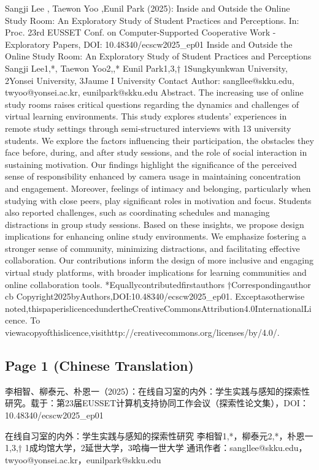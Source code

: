 \documentclass[12pt]{ctexart}
\begin{document}
Sangji Lee , Taewon Yoo ,Eunil Park (2025): Inside and Outside the Online Study
Room: An Exploratory Study of Student Practices and Perceptions. In: Proc. 23rd
EUSSET Conf. on Computer-Supported Cooperative Work - Exploratory Papers, DOI:
10.48340/ecscw2025\_ep01
Inside and Outside the Online Study
Room: An Exploratory Study of Student
Practices and Perceptions
Sangji Lee1,*, Taewon Yoo2,,* Eunil Park1,3,†
1Sungkyunkwan University, 2Yonsei University, 3Jaume I University
Contact Author: sangllee@skku.edu, twyoo@yonsei.ac.kr, eunilpark@skku.edu
Abstract. The increasing use of online study rooms raises critical questions regarding the
dynamics and challenges of virtual learning environments. This study explores students’
experiences in remote study settings through semi-structured interviews with 13 university
students. We explore the factors influencing their participation, the obstacles they face
before, during, and after study sessions, and the role of social interaction in sustaining
motivation. Our findings highlight the significance of the perceived sense of responsibility
enhanced by camera usage in maintaining concentration and engagement. Moreover,
feelings of intimacy and belonging, particularly when studying with close peers, play
significant roles in motivation and focus. Students also reported challenges, such as
coordinating schedules and managing distractions in group study sessions. Based on
these insights, we propose design implications for enhancing online study environments.
We emphasize fostering a stronger sense of community, minimizing distractions, and
facilitating effective collaboration. Our contributions inform the design of more inclusive
and engaging virtual study platforms, with broader implications for learning communities
and online collaboration tools.
*Equallycontributedfirstauthors
†Correspondingauthor
cb
Copyright2025byAuthors,DOI:10.48340/ecscw2025\_ep01. Exceptasotherwise
noted,thispaperislicencedundertheCreativeCommonsAttribution4.0InternationalLicence. To
viewacopyofthislicence,visithttp://creativecommons.org/licenses/by/4.0/.

\subsection*{Page 1 (Chinese Translation)}

李相智、柳泰元、朴恩一（2025）：在线自习室的内外：学生实践与感知的探索性研究。载于：第23届EUSSET计算机支持协同工作会议（探索性论文集），DOI：10.48340/ecscw2025\_ep01

在线自习室的内外：学生实践与感知的探索性研究
李相智1,*，柳泰元2,*，朴恩一1,3,†
1成均馆大学，2延世大学，3哈梅一世大学
通讯作者：sangllee@skku.edu，twyoo@yonsei.ac.kr，eunilpark@skku.edu
\end{document}
